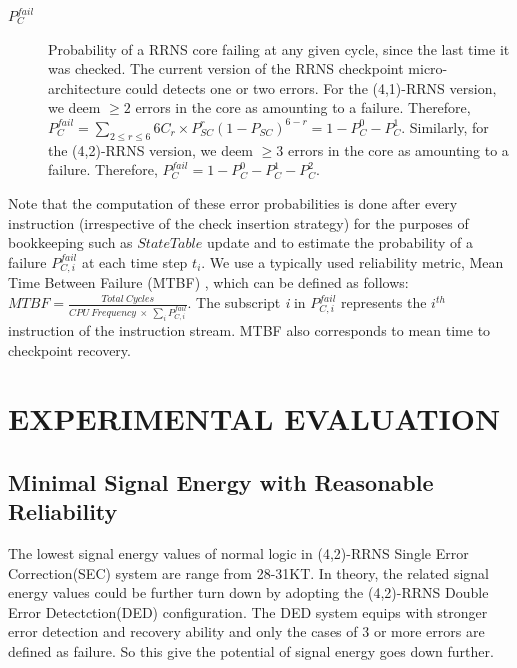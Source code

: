 \documentclass{sig-alternate}
\begin{document}
\begin{description}
\item[$P_C^{fail}$]
Probability of a RRNS core failing at any given cycle, since the last time it was checked. The current version of the RRNS checkpoint micro-architecture could detects one or two errors. For the (4,1)-RRNS version, we deem $\geq 2$ errors in the core as amounting to a failure. Therefore, $P_C^{fail}=\sum_{2\leq r\leq 6} 6C_r\times P_{SC}^r(1-P_{SC})^{6-r}=1-P_C^0-P_C^1$.  Similarly, for the (4,2)-RRNS version, we deem $\geq 3$ errors in the core as amounting to a failure. Therefore, $P_C^{fail}=1-P_C^0-P_C^1-P_C^2$. 

\end{description}

Note that the computation of these error probabilities is done after every instruction (irrespective of the check insertion strategy) for the purposes of bookkeeping such as $StateTable$ update and to estimate the probability of a failure $P_{C, i}^{fail}$ at each time step $t_i$. We use a typically used reliability metric, Mean Time Between Failure (MTBF) \cite{tan2004process}, which can be defined as follows: $MTBF=\frac{Total~Cycles}{CPU~Frequency~\times~\sum_iP_{C, i}^{fail}}$. The subscript \textit{i} in $P_{C, i}^{fail}$ represents the ${i}^{th}$ instruction of the instruction stream. MTBF also corresponds to mean time to checkpoint recovery. 


\section{EXPERIMENTAL EVALUATION}
\label{Evaluation}

\subsection{Minimal Signal Energy with Reasonable Reliability}
\label{sub:SignalEnergy}
The lowest signal energy values of normal logic in (4,2)-RRNS Single Error Correction(SEC) system are range from 28-31KT\cite{DengTACO18}. In theory, the related signal energy values could be further turn down by adopting the (4,2)-RRNS Double Error Detectction(DED) configuration. The DED system equips with stronger error detection and recovery ability and only the cases of 3 or more errors are defined as failure. So this give the potential of signal energy goes down further. 
\end{document}
